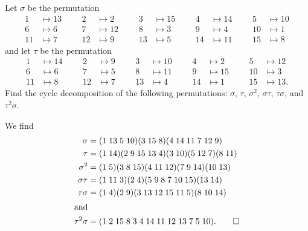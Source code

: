  Let $\sigma$ be the permutation
\begin{align*}
  1 &\mapsto 13 &&& 2 &\mapsto 2 &&& 3 &\mapsto 15 &&& 4 &\mapsto 14
  &&& 5 &\mapsto 10 \\
  6 &\mapsto 6 &&& 7 &\mapsto 12 &&& 8 &\mapsto 3 &&& 9 &\mapsto 4
  &&& 10 &\mapsto 1 \\
  11 &\mapsto 7 &&& 12 &\mapsto 9 &&& 13 &\mapsto 5 &&& 14 &\mapsto 11
  &&& 15 &\mapsto 8
\end{align*}
and let $\tau$ be the permutation
\begin{align*}
  1 &\mapsto 14 &&& 2 &\mapsto 9 &&& 3 &\mapsto 10 &&& 4 &\mapsto 2
  &&& 5 &\mapsto 12 \\
  6 &\mapsto 6 &&& 7 &\mapsto 5 &&& 8 &\mapsto 11 &&& 9 &\mapsto 15
  &&& 10 &\mapsto 3 \\
  11 &\mapsto 8 &&& 12 &\mapsto 7 &&& 13 &\mapsto 4 &&& 14 &\mapsto 1
  &&& 15 &\mapsto 13.
\end{align*}
Find the cycle decomposition of the following permutations: $\sigma$,
$\tau$, $\sigma^2$, $\sigma\tau$, $\tau\sigma$, and $\tau^2\sigma$.
\begin{solution}
  We find
  \begin{align*}
    \sigma &= (1\;13\;5\;10)(3\;15\;8)(4\;14\;11\;7\;12\;9) \\
    \tau &= (1\;14)(2\;9\;15\;13\;4)(3\;10)(5\;12\;7)(8\;11) \\
    \sigma^2 &= (1\;5)(3\;8\;15)(4\;11\;12)(7\;9\;14)(10\;13) \\
    \sigma\tau &= (1\;11\;3)(2\;4)(5\;9\;8\;7\;10\;15)(13\;14) \\
    \tau\sigma &= (1\;4)(2\;9)(3\;13\;12\;15\;11\;5)(8\;10\;14) \\
    \intertext{and}
    \tau^2\sigma &= (1\;2\;15\;8\;3\;4\;14\;11\;12\;13\;7\;5\;10).
                   \qedhere
  \end{align*}
\end{solution}

